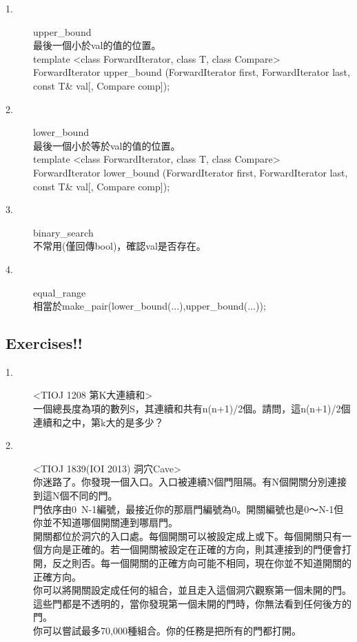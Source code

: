 \documentclass{article}
\begin{document}
\begin{description}
\item[ 1.]upper\_bound\\
最後一個小於val的值的位置。\\
template <class ForwardIterator, class T, class Compare>\\
ForwardIterator upper\_bound (ForwardIterator first, ForwardIterator last,\\
\hspace*{2em}const T\& val[, Compare comp]);
\item[ 2.]lower\_bound\\
最後一個小於等於val的值的位置。\\
template <class ForwardIterator, class T, class Compare>\\
ForwardIterator lower\_bound (ForwardIterator first, ForwardIterator last,\\
\hspace*{2em}const T\& val[, Compare comp]);
\item[ 3.]binary\_search\\
不常用(僅回傳bool)，確認val是否存在。
\item[ 4.]equal\_range\\
相當於make\_pair(lower\_bound(...),upper\_bound(...));
\end{description}


\subsection{Exercises!!}

\begin{description}
\item[ 1.]<TIOJ 1208 第K大連續和>\\
一個總長度為項的數列S，其連續和共有n(n+1)/2個。請問，這n(n+1)/2個連續和之中，第k大的是多少？
\item[ 2.]<TIOJ 1839(IOI 2013) 洞穴Cave>\\
你迷路了。你發現一個入口。入口被連續N個門阻隔。有N個開關分別連接到這N個不同的門。\\
門依序由0~N-1編號，最接近你的那扇門編號為0。開關編號也是0～N-1但你並不知道哪個開關連到哪扇門。\\
開關都位於洞穴的入口處。每個開關可以被設定成上或下。每個開關只有一個方向是正確的。若一個開關被設定在正確的方向，則其連接到的門便會打開，反之則否。每一個開關的正確方向可能不相同，現在你並不知道開關的正確方向。\\
你可以將開關設定成任何的組合，並且走入這個洞穴觀察第一個未開的門。這些門都是不透明的，當你發現第一個未開的門時，你無法看到任何後方的門。\\
你可以嘗試最多70,000種組合。你的任務是把所有的門都打開。
\end{description} 
\end{document}
